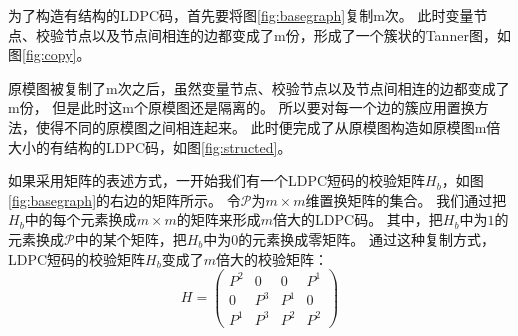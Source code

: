 为了构造有结构的LDPC码，首先要将图\ref{fig:basegraph}复制m次。
此时变量节点、校验节点以及节点间相连的边都变成了m份，形成了一个簇状的Tanner图，如图\ref{fig:copy}。
\begin{center}
\def\check{%
    \filldraw [fill=white,very thick] (0,0) circle (5pt);
    \draw [very thick] (0,3.5pt)--(0,-3.5pt);
    \draw [very thick] (3.5pt,0)--(-3.5pt,0);
}
\def\bit{%
    \filldraw [fill=white,very thick] (0,0) circle (5pt);
    \draw [very thick] (-3.2pt,2.2pt)--(3.2pt,2.2pt);
    \draw [very thick] (-3.2pt,-2.2pt)--(3.2pt,-2.2pt);
}
\label{fig:copy}
\end{center}

原模图被复制了m次之后，虽然变量节点、校验节点以及节点间相连的边都变成了m份，
但是此时这m个原模图还是隔离的。
所以要对每一个边的簇应用置换方法，使得不同的原模图之间相连起来。
此时便完成了从原模图构造如原模图m倍大小的有结构的LDPC码，如图\ref{fig:structed}。

如果采用矩阵的表述方式，一开始我们有一个LDPC短码的校验矩阵$H_b$，如图\ref{fig:basegraph}的右边的矩阵所示。
令$\mathcal{P}$为$m\times m$维置换矩阵的集合。
我们通过把$H_b$中的每个元素换成$m\times m$的矩阵来形成$m$倍大的LDPC码。
其中，把$H_b$中为$1$的元素换成$\mathcal{P}$中的某个矩阵，把$H_b$中为$0$的元素换成零矩阵。
通过这种复制方式，LDPC短码的校验矩阵$H_b$变成了$m$倍大的校验矩阵：
\begin{equation}
    H = \left(
      \begin{array}{cccc}
        P^2 & 0 & 0 & P^1 \\
        0 & P^3 & P^1 & 0 \\
        P^1 & P^3 & P^2 & P^2 
      \end{array} \right)
\end{equation}

